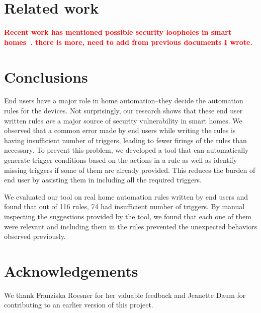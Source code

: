 \documentclass{sig-alternate-05-2015}
\newcommand\todo[1]{\textbf{\textcolor{red}{#1}}}
\begin{document}
\section{Related work}
\todo{\cite{smartthings16, todayToTomorrow, rvs, homer, utea}
Recent work has mentioned possible security loopholes in smart homes~\cite{yoshi, dhanjani, jung}. there is more, need to add from previous documents I wrote.}

\section{Conclusions}
End users have a major role in home automation--they decide the automation rules for the devices. Not surprisingly, our research shows that these end user written rules \textit{are} a major source of security vulnerability in smart homes.
We observed that a common error made by end users while writing the rules is having insufficient number of triggers, leading to fewer firings of the rules than necessary. To prevent this problem, we developed a tool that can automatically generate trigger conditions based on the actions in a rule as well as identify missing triggers if some of them are already provided. This reduces the burden of end user by assisting them in including all the required triggers. 

We evaluated our tool on real home automation rules written by end users and found that out of 116 rules, 74 had insufficient number of triggers. By manual inspecting the suggestions provided by the tool, we found that each one of them were relevant and including them in the rules prevented the unexpected behaviors observed previously. 


\section{Acknowledgements}
We thank Franziska Roesner for her valuable feedback and Jeanette Daum for contributing to an earlier version of this project.

  
\end{document}
